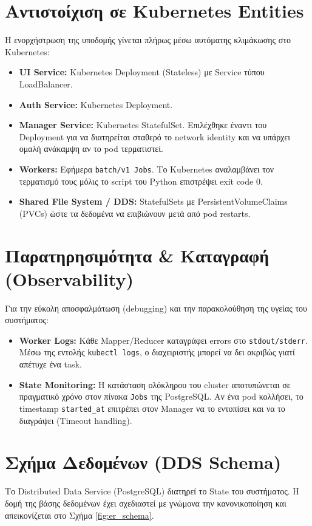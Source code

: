 \documentclass[11pt, a4paper]{article}
\begin{document}
\section{Αντιστοίχιση σε Kubernetes Entities}
Η ενορχήστρωση της υποδομής γίνεται πλήρως μέσω αυτόματης κλιμάκωσης στο Kubernetes:
\begin{itemize}
    \item \textbf{UI Service:} Kubernetes Deployment (Stateless) με Service τύπου LoadBalancer.
    \item \textbf{Auth Service:} Kubernetes Deployment.
    \item \textbf{Manager Service:} Kubernetes StatefulSet. Επιλέχθηκε έναντι του Deployment για να διατηρείται σταθερό το network identity και να υπάρχει ομαλή ανάκαμψη αν το pod τερματιστεί.
    \item \textbf{Workers:} Εφήμερα \texttt{batch/v1 Jobs}. Το Kubernetes αναλαμβάνει τον τερματισμό τους μόλις το script του Python επιστρέψει exit code 0.
    \item \textbf{Shared File System / DDS:} StatefulSets με PersistentVolumeClaims (PVCs) ώστε τα δεδομένα να επιβιώνουν μετά από pod restarts.
\end{itemize}

\section{Παρατηρησιμότητα \& Καταγραφή (Observability)}
Για την εύκολη αποσφαλμάτωση (debugging) και την παρακολούθηση της υγείας του συστήματος:
\begin{itemize}
    \item \textbf{Worker Logs:} Κάθε Mapper/Reducer καταγράφει errors στο \texttt{stdout/stderr}. Μέσω της εντολής \texttt{kubectl logs}, ο διαχειριστής μπορεί να δει ακριβώς γιατί απέτυχε ένα task.
    \item \textbf{State Monitoring:} H κατάσταση ολόκληρου του cluster αποτυπώνεται σε πραγματικό χρόνο στον πίνακα \texttt{Jobs} της PostgreSQL. Αν ένα pod κολλήσει, το timestamp \texttt{started\_at} επιτρέπει στον Manager να το εντοπίσει και να το διαγράψει (Timeout handling).
\end{itemize}

\newpage %

\section{Σχήμα Δεδομένων (DDS Schema)}
Το Distributed Data Service (PostgreSQL) διατηρεί το State του συστήματος. Η δομή της βάσης δεδομένων έχει σχεδιαστεί με γνώμονα την κανονικοποίηση και απεικονίζεται στο Σχήμα \ref{fig:er_schema}.
\end{document}
